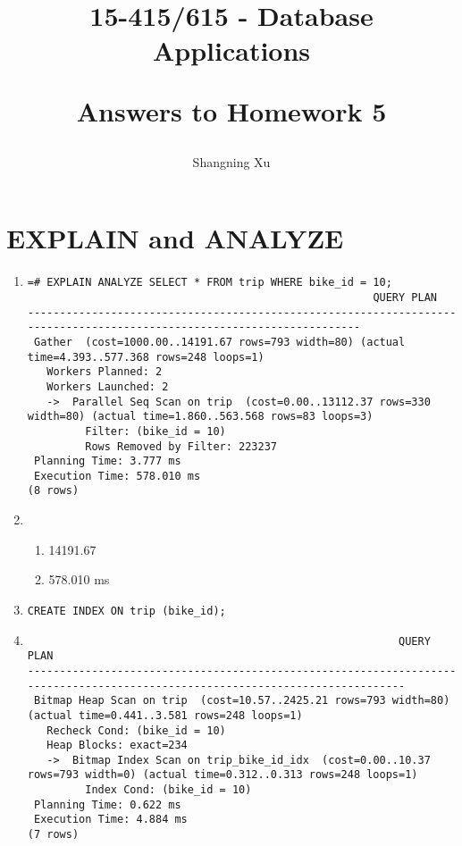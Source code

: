 \documentclass{homework}
\title{
    15-415/615 - Database Applications

    Answers to Homework 5
}
\author{Shangning Xu}
\begin{document}
\maketitle

\section{EXPLAIN and ANALYZE}

\begin{enumerate}
    \item \begin{verbatim}
=# EXPLAIN ANALYZE SELECT * FROM trip WHERE bike_id = 10;
                                                      QUERY PLAN
-----------------------------------------------------------------------------------------------------------------------
 Gather  (cost=1000.00..14191.67 rows=793 width=80) (actual time=4.393..577.368 rows=248 loops=1)
   Workers Planned: 2
   Workers Launched: 2
   ->  Parallel Seq Scan on trip  (cost=0.00..13112.37 rows=330 width=80) (actual time=1.860..563.568 rows=83 loops=3)
         Filter: (bike_id = 10)
         Rows Removed by Filter: 223237
 Planning Time: 3.777 ms
 Execution Time: 578.010 ms
(8 rows)
\end{verbatim}

    \item \begin{enumerate}
        \item 14191.67
        \item 578.010 ms
    \end{enumerate}

    \item \texttt{CREATE INDEX ON trip (bike_id);}
    
    \item \begin{verbatim}
                                                          QUERY PLAN
------------------------------------------------------------------------------------------------------------------------------
 Bitmap Heap Scan on trip  (cost=10.57..2425.21 rows=793 width=80) (actual time=0.441..3.581 rows=248 loops=1)
   Recheck Cond: (bike_id = 10)
   Heap Blocks: exact=234
   ->  Bitmap Index Scan on trip_bike_id_idx  (cost=0.00..10.37 rows=793 width=0) (actual time=0.312..0.313 rows=248 loops=1)
         Index Cond: (bike_id = 10)
 Planning Time: 0.622 ms
 Execution Time: 4.884 ms
(7 rows)
\end{verbatim}


\end{enumerate}
\end{document}
